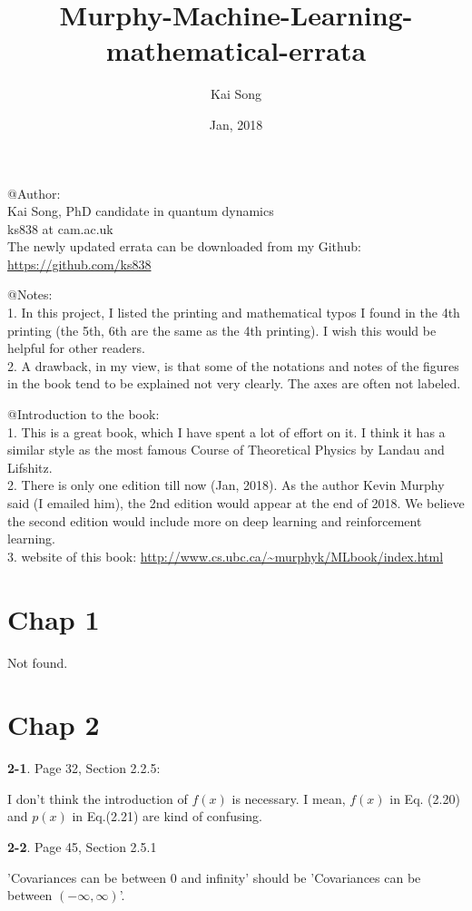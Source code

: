 \documentclass[aps,preprint,a4]{revtex4-1}
\begin{document}
\title{Murphy-Machine-Learning-mathematical-errata}
\author{Kai Song}
\date{Jan, 2018}
\maketitle
@Author: \\
         Kai Song, PhD candidate in quantum dynamics\\
         ks838 at cam.ac.uk\\
         The newly updated errata can be downloaded from my Github: \url{https://github.com/ks838}

@Notes: \\
        1. In this project, I listed the printing and mathematical typos I found in the 4th printing (the 5th, 6th are the same as the 4th printing). I wish this would be helpful for other readers. \\
        2. A drawback, in my view, is that some of the notations and notes of the figures in the book tend to be explained not very clearly. The axes are often not labeled. 

@Introduction to the book:\\
        1. This is a great book, which I have spent a lot of effort on it. I think it has a similar style as the most famous  Course of Theoretical Physics by Landau and Lifshitz. \\
        2. There is only one edition till now (Jan, 2018). As the author Kevin Murphy said (I emailed him), the 2nd edition would appear at the end of 2018. We believe the second edition would include more on deep learning and reinforcement learning.\\
        3. website of this book: \url{http://www.cs.ubc.ca/~murphyk/MLbook/index.html}

\section{Chap 1}
Not found.
\section{Chap 2}
{\color{red}\textbf{2-1}}. Page 32, Section 2.2.5:

I don't think the introduction of $f(x)$ is necessary. I mean, $f(x)$ in Eq. (2.20) and $p(x)$ in Eq.(2.21)
are kind of confusing.

{\color{red}\textbf{2-2}}. Page 45, Section 2.5.1

'Covariances can be between 0 and infinity' should be 'Covariances can be between $(-\infty, \infty)$'.
\end{document}
